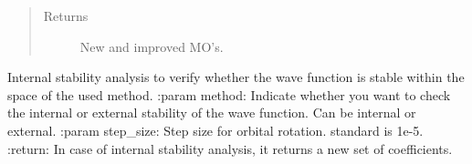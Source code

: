 \documentclass[letterpaper,10pt,english]{sphinxmanual}
\begin{document}
\begin{fulllineitems}
\begin{fulllineitems}
\begin{sphinxVerbatim}[commandchars=\\\{\}]
   
           
   
  
\end{sphinxVerbatim}
\begin{quote}\begin{description}
\item[{Returns}] \leavevmode
New and improved MO’s.

\end{description}\end{quote}

\end{fulllineitems}


\begin{fulllineitems}
\label{\detokenize{UHF:hf.HartreeFock.UHF.MF.stability_analysis}}
Internal stability analysis to verify whether the wave function is stable within the space of the used method.
:param method: Indicate whether you want to check the internal or external stability of the wave function. Can
be internal or external.
:param step\_size: Step size for orbital rotation. standard is 1e-5.
:return: In case of internal stability analysis, it returns a new set of coefficients.

\end{fulllineitems}


\end{fulllineitems}
\end{document}
